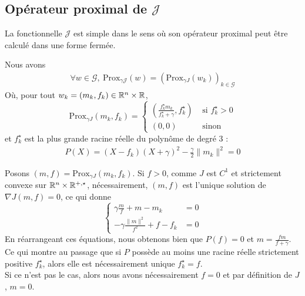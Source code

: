 \documentclass[a4paper,12pt]{article}
\newcommand{\prox}{\text{Prox}}
\begin{document}
\subsection{Opérateur proximal de $\mathcal{J}$}
La fonctionnelle $\mathcal{J}$ est simple dans le sens où son opérateur proximal peut être calculé dans une forme fermée. 
\begin{proposition}
\label{prop:proxJ}
Nous avons
\begin{align*}
\forall w\in\mathcal{G},\ \prox_{\gamma \mathcal{J}}(w) = \left( \prox_{\gamma J}(w_k)\right)_{k\in\mathcal{G}}
\end{align*}
Où, pour tout $w_k=(m_k,f_k)\in\mathbb{R}^n\times\mathbb{R}$, 
$$
\prox_{\gamma J}(m_k,f_k) =\left\{
\begin{array}{cl}
\left(\frac{f^{\star}_k m_k}{f^{\star}_k+\gamma} ,f^{\star}_k\right) & \text{ si } f^{\star}_k >0\\
(0,0) & \text{ sinon }
\end{array}\right.
$$
et $f^{\star}_k$ est la plus grande racine réelle du polynôme de degré 3 : 
\begin{align}
P(X) = (X-f_k)(X+\gamma)^2 -\frac{\gamma}{2}\|m_k\|^2=0
\end{align}
\end{proposition}
\begin{preuve}
Posons $(m,f)=\prox_{\gamma J}(m_k,f_k)$. Si $f>0$, comme $J$ est $C^1$ et strictement convexe sur $\mathbb{R}^n\times\mathbb{R}^{+,\star}$, nécessairement, $(m,f)$ est l'unique solution de $\nabla J(m,f)=0$, ce qui donne 
$$
\left\{
\begin{array}{cc}
\gamma \frac{m}{f}+m-m_k &= 0\\
-\gamma \frac{\|m\|^2}{f^2} + f-f_k &= 0
\end{array}
\right.
$$
En réarrangeant ces équations, nous obtenons bien que $P(f) = 0$ et $m=\frac{f m}{f+\gamma}$. Ce qui montre au passage que si $P$ possède au moins une racine réelle strictement positive $f^{\star}_k$, alors elle est nécessairement unique $f^{\star}_k =f $. \\
Si ce n'est pas le cas, alors nous avons nécessairement $f= 0$ et par définition de $J$, $m=0$.
\end{preuve}
\end{document}
